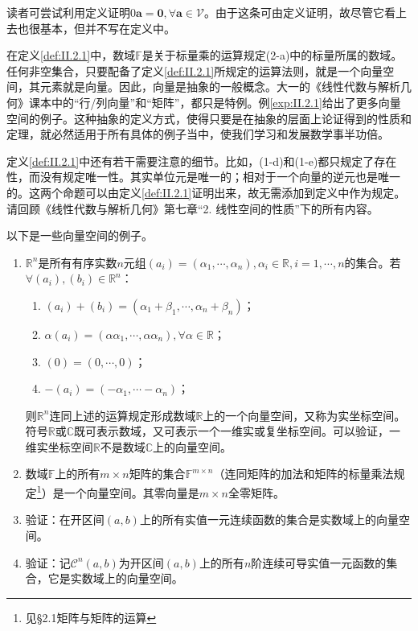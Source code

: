 \documentclass[../main.tex]{subfiles}
\begin{document}
读者可尝试利用定义证明$0\mathbf{a}=\mathbf{0},\forall\mathbf{a}\in\mathcal{V}$。由于这条可由定义证明，故尽管它看上去也很基本，但并不写在定义中。

在定义\ref{def:II.2.1}中，数域$\mathbb{F}$是关于标量乘的运算规定(2-a)中的标量所属的数域。任何非空集合，只要配备了定义\ref{def:II.2.1}所规定的运算法则，就是一个向量空间，其元素就是向量。因此，向量是抽象的一般概念。大一的《线性代数与解析几何》课本中的“行/列向量”和“矩阵”，都只是特例。例\ref{exp:II.2.1}给出了更多向量空间的例子。这种抽象的定义方式，使得只要是在抽象的层面上论证得到的性质和定理，就必然适用于所有具体的例子当中，使我们学习和发展数学事半功倍。

定义\ref{def:II.2.1}中还有若干需要注意的细节。比如，(1-d)和(1-e)都只规定了存在性，而没有规定唯一性。其实单位元是唯一的；相对于一个向量的逆元也是唯一的。这两个命题可以由定义\ref{def:II.2.1}证明出来，故无需添加到定义中作为规定。请回顾《线性代数与解析几何》第七章“2. 线性空间的性质”下的所有内容。

\begin{example}\label{exp:II.2.1}
    以下是一些向量空间的例子。
    \begin{enumerate}
        \item $\mathbb{R}^n$是所有有序实数$n$元组$\left(a_i\right)=\left(\alpha_1,\cdots,\alpha_n\right),\alpha_i\in\mathbb{R},i=1,\cdots,n$的集合。若$\forall \left(a_i\right),\left(b_i\right)\in\mathbb{R}^n$：
              \begin{enumerate}
                  \item $\left(a_i\right)+\left(b_i\right)=\left(\alpha_1+\beta_1,\cdots,\alpha_n+\beta_n\right)$；
                  \item $\alpha\left(a_i\right)=\left(\alpha\alpha_1,\cdots,\alpha\alpha_n\right),\forall\alpha\in\mathbb{R}$；
                  \item $\left(0\right)=\left(0,\cdots,0\right)$；
                  \item $-\left(a_i\right)=\left(-\alpha_1,\cdots-\alpha_n\right)$；
              \end{enumerate}
              则$\mathbb{R}^n$连同上述的运算规定形成数域$\mathbb{R}$上的一个向量空间，又称为实坐标空间。符号$\mathbb{R}$或$\mathbb{C}$既可表示数域，又可表示一个一维实或复坐标空间。可以验证，一维实坐标空间$\mathbb{R}$不是数域$\mathbb{C}$上的向量空间。
        \item 数域$\mathbb{F}$上的所有$m\times n$矩阵的集合$\mathbb{F}^{m\times n}$（连同矩阵的加法和矩阵的标量乘法规定\footnote{见\cite{周胜林2012线性代数}\S 2.1矩阵与矩阵的运算}）是一个向量空间。其零向量是$m\times n$全零矩阵\cite[\S 7.1例1.3]{周胜林2012线性代数}。
        \item 验证：在开区间$\left(a,b\right)$上的所有实值一元连续函数的集合是实数域上的向量空间\cite[\S 7.1]{周胜林2012线性代数}。
        \item 验证：记$\mathcal{C}^n\left(a,b\right)$为开区间$\left(a,b\right)$上的所有$n$阶连续可导实值一元函数的集合，它是实数域上的向量空间。
    \end{enumerate}
\end{example}
\end{document}
